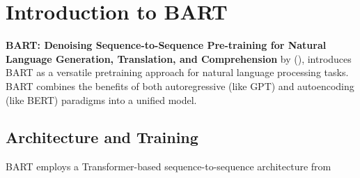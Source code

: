 

\section{Introduction to BART}\label{sec:bart}
    \textbf{BART: Denoising Sequence-to-Sequence Pre-training for Natural Language Generation, Translation, and Comprehension} by (\cite{lewis2019bart}), introduces BART as a versatile pretraining approach for natural language processing tasks. BART combines the benefits of both autoregressive (like GPT) and autoencoding (like BERT) paradigms into a unified model.

    \subsection{Architecture and Training}
    BART employs a Transformer-based sequence-to-sequence architecture from 
    
